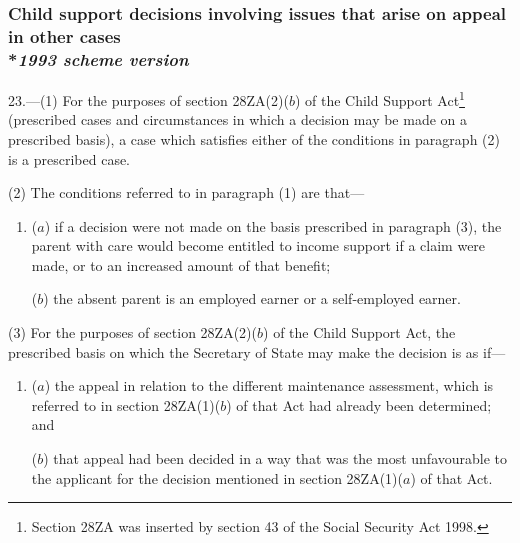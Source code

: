 \documentclass[12pt,a4paper]{article}
\begin{document}

\subsubsection[23. Child support decisions involving issues that arise on appeal in other cases --- \emph{1993 scheme version}]{Child support decisions involving issues that arise on appeal in other cases\\*\emph{1993 scheme version}}

23.—(1) For the purposes of section 28ZA(2)($b$) of the Child Support Act\footnote{\frenchspacing Section 28ZA was inserted by section 43 of the Social Security Act 1998.} (prescribed cases and circumstances in which a decision may be made on a prescribed basis), a case which satisfies either of the conditions in paragraph (2) is a prescribed case.

(2) The conditions referred to in paragraph (1) are that—
\begin{enumerate}\item[]
($a$) if a decision were not made on the basis prescribed in paragraph (3), the parent with care would become entitled to income support if a claim were made, or to an increased amount of that benefit;

($b$) the absent parent is an employed earner or a self-employed earner.
\end{enumerate}

(3) For the purposes of section 28ZA(2)($b$) of the Child Support Act, the prescribed basis on which the Secretary of State may make the decision is as if—
\begin{enumerate}\item[]
($a$) the appeal in relation to the different maintenance assessment, which is referred to in section 28ZA(1)($b$) of that Act had already been determined; and

($b$) that appeal had been decided in a way that was the most unfavourable to the applicant for the decision mentioned in section 28ZA(1)($a$) of that Act.
\end{enumerate}
\end{document}
